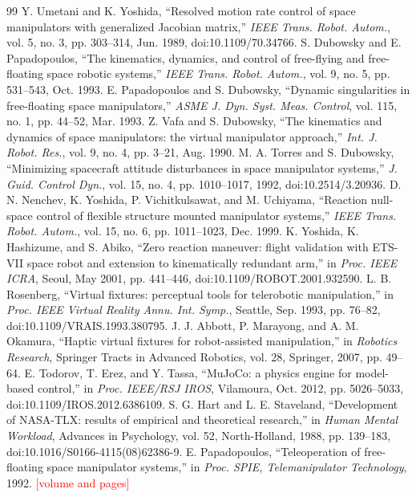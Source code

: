\documentclass[pdflatex,sn-mathphys-num]{sn-jnl}
\newcommand{\todo}[1]{\textcolor{red}{[#1]}}
\begin{document}
\begin{thebibliography}{99}
 Y. Umetani and K. Yoshida, ``Resolved motion rate control of space manipulators with generalized Jacobian matrix,'' \emph{IEEE Trans. Robot. Autom.}, vol. 5, no. 3, pp. 303--314, Jun. 1989, doi:10.1109/70.34766.
 S. Dubowsky and E. Papadopoulos, ``The kinematics, dynamics, and control of free-flying and free-floating space robotic systems,'' \emph{IEEE Trans. Robot. Autom.}, vol. 9, no. 5, pp. 531--543, Oct. 1993.
 E. Papadopoulos and S. Dubowsky, ``Dynamic singularities in free-floating space manipulators,'' \emph{ASME J. Dyn. Syst. Meas. Control}, vol. 115, no. 1, pp. 44--52, Mar. 1993.
 Z. Vafa and S. Dubowsky, ``The kinematics and dynamics of space manipulators: the virtual manipulator approach,'' \emph{Int. J. Robot. Res.}, vol. 9, no. 4, pp. 3--21, Aug. 1990.
 M. A. Torres and S. Dubowsky, ``Minimizing spacecraft attitude disturbances in space manipulator systems,'' \emph{J. Guid. Control Dyn.}, vol. 15, no. 4, pp. 1010--1017, 1992, doi:10.2514/3.20936.
 D. N. Nenchev, K. Yoshida, P. Vichitkulsawat, and M. Uchiyama, ``Reaction null-space control of flexible structure mounted manipulator systems,'' \emph{IEEE Trans. Robot. Autom.}, vol. 15, no. 6, pp. 1011--1023, Dec. 1999.
 K. Yoshida, K. Hashizume, and S. Abiko, ``Zero reaction maneuver: flight validation with ETS-VII space robot and extension to kinematically redundant arm,'' in \emph{Proc. IEEE ICRA}, Seoul, May 2001, pp. 441--446, doi:10.1109/ROBOT.2001.932590.
 L. B. Rosenberg, ``Virtual fixtures: perceptual tools for telerobotic manipulation,'' in \emph{Proc. IEEE Virtual Reality Annu. Int. Symp.}, Seattle, Sep. 1993, pp. 76--82, doi:10.1109/VRAIS.1993.380795.
 J. J. Abbott, P. Marayong, and A. M. Okamura, ``Haptic virtual fixtures for robot-assisted manipulation,'' in \emph{Robotics Research}, Springer Tracts in Advanced Robotics, vol. 28, Springer, 2007, pp. 49--64.
 E. Todorov, T. Erez, and Y. Tassa, ``MuJoCo: a physics engine for model-based control,'' in \emph{Proc. IEEE/RSJ IROS}, Vilamoura, Oct. 2012, pp. 5026--5033, doi:10.1109/IROS.2012.6386109.
 S. G. Hart and L. E. Staveland, ``Development of NASA-TLX: results of empirical and theoretical research,'' in \emph{Human Mental Workload}, Advances in Psychology, vol. 52, North-Holland, 1988, pp. 139--183, doi:10.1016/S0166-4115(08)62386-9.
 E. Papadopoulos, ``Teleoperation of free-floating space manipulator systems,'' in \emph{Proc. SPIE, Telemanipulator Technology}, 1992. \todo{volume and pages}

\end{thebibliography}
\end{document}

